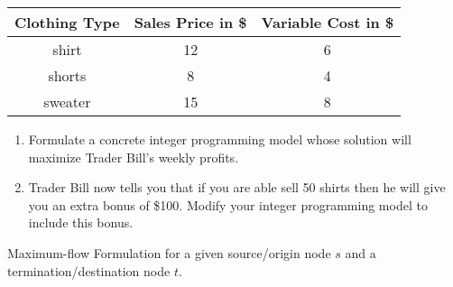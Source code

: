 \documentclass{article}
\begin{document}
\begin{enumerate}
\begin{center} \label{table3}
\begin{tabular}{ |c|c|c| } 
    \hline
    Clothing Type & Sales Price in \$ & Variable Cost in \$  \\ 
    \hline
    shirt & 12 & 6\\
    \hline
    shorts & 8 & 4\\
    \hline
    sweater & 15 & 8 \\
    \hline
\end{tabular}
\end{center}

\begin{enumerate}
\item  Formulate a concrete integer programming model whose solution will maximize Trader Bill's weekly profits.

\vspace{8cm}

\item Trader Bill now tells you that if you are able sell 50 shirts then he will give you an extra bonus of \$100. Modify your integer programming model to include this bonus.
\end{enumerate}



Maximum-flow Formulation for a given source/origin node $s$ and a termination/destination node $t$.

\end{enumerate}
\end{document}
